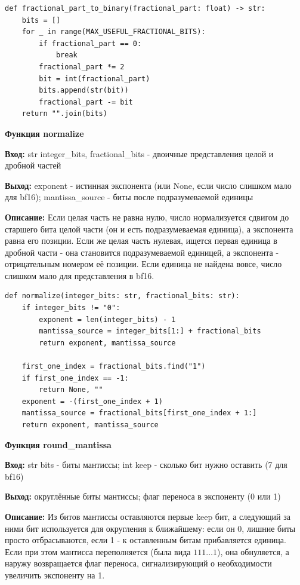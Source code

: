 \begin{lstlisting}[caption=fractional\_part\_to\_binary, label=lst:fractional-part-to-binary]
def fractional_part_to_binary(fractional_part: float) -> str:
    bits = []
    for _ in range(MAX_USEFUL_FRACTIONAL_BITS):
        if fractional_part == 0:
            break
        fractional_part *= 2
        bit = int(fractional_part)
        bits.append(str(bit))
        fractional_part -= bit
    return "".join(bits)
\end{lstlisting}

\textbf{Функция normalize } \par
\textbf{Вход:} str integer\_bits, fractional\_bits - двоичные представления целой и дробной частей \par
\textbf{Выход:} exponent - истинная экспонента (или None, если число слишком мало для bf16); mantissa\_source - биты после подразумеваемой единицы \par
\textbf{Описание:} Если целая часть не равна нулю, число нормализуется сдвигом до старшего бита целой части (он и есть подразумеваемая единица), а экспонента равна его позиции. Если же целая часть нулевая, ищется первая единица в дробной части - она становится подразумеваемой единицей, а экспонента - отрицательным номером её позиции. Если единица не найдена вовсе, число слишком мало для представления в bf16.\par
\vspace{10pt}

\begin{lstlisting}[caption=normalize, label=lst:normalize]
def normalize(integer_bits: str, fractional_bits: str):
    if integer_bits != "0":
        exponent = len(integer_bits) - 1
        mantissa_source = integer_bits[1:] + fractional_bits
        return exponent, mantissa_source

    first_one_index = fractional_bits.find("1")
    if first_one_index == -1:
        return None, ""
    exponent = -(first_one_index + 1)
    mantissa_source = fractional_bits[first_one_index + 1:]
    return exponent, mantissa_source
\end{lstlisting}

\textbf{Функция round\_mantissa } \par
\textbf{Вход:} str bits - биты мантиссы; int keep - сколько бит нужно оставить (7 для bf16) \par
\textbf{Выход:} округлённые биты мантиссы; флаг переноса в экспоненту (0 или 1) \par
\textbf{Описание:} Из битов мантиссы оставляются первые keep бит, а следующий за ними бит используется для округления к ближайшему: если он 0, лишние биты просто отбрасываются, если 1 - к оставленным битам прибавляется единица. Если при этом мантисса переполняется (была вида $111\ldots1$), она обнуляется, а наружу возвращается флаг переноса, сигнализирующий о необходимости увеличить экспоненту на 1.\par
\vspace{10pt}

